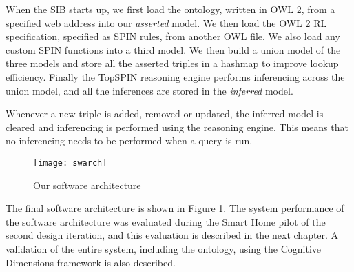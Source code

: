 When the \ac{SIB} starts up, we first load the ontology, written in \ac{OWL} 2, from a specified web address into our \emph{asserted} model. We then load the OWL 2 RL specification, specified as \ac{SPIN} rules, from another \ac{OWL} file. We also load any custom \ac{SPIN} functions into a third model. We then build a union model of the three models and store all the asserted triples in a hashmap to improve lookup efficiency. Finally the TopSPIN reasoning engine performs inferencing across the union model, and all the inferences are stored in the \emph{inferred} model.

Whenever a new triple is added, removed or updated, the inferred model is cleared and inferencing is performed using the reasoning engine. This means that no inferencing needs to be performed when a query is run. 

\begin{figure}[bth]
	\centering
	\centerline{\texttt{[image: swarch]}}
	\caption{Our software architecture}
	\label{swarch}
\end{figure}

The final software architecture is shown in Figure \ref{swarch}. The system performance of the software architecture was evaluated during the Smart Home pilot of the second design iteration, and this evaluation is described in the next chapter. A validation of the entire system, including the ontology, using the Cognitive Dimensions framework is also described.







